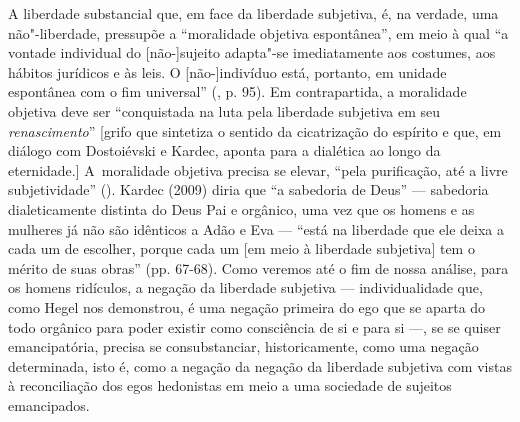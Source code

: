 A liberdade substancial que, em face da liberdade subjetiva, é, na
verdade, uma não"-liberdade, pressupõe a ``moralidade objetiva
espontânea'', em meio à qual ``a vontade individual do {[}não-{]}sujeito
adapta"-se imediatamente aos costumes, aos hábitos jurídicos e às leis. O
{[}não-{]}indivíduo está, portanto, em unidade espontânea com o fim
universal'' (, p. 95). Em contrapartida, a moralidade objetiva deve
ser ``conquistada na luta pela liberdade subjetiva em seu
\emph{renascimento}'' {[}grifo que sintetiza o sentido da cicatrização
do espírito e que, em diálogo com Dostoiévski e Kardec, aponta para a
dialética ao longo da eternidade.{]} A~moralidade objetiva precisa se
elevar, ``pela purificação, até a livre subjetividade'' (). Kardec
(2009) diria que ``a sabedoria de Deus'' --- sabedoria dialeticamente
distinta do Deus Pai e orgânico, uma vez que os homens e as mulheres já
não são idênticos a Adão e Eva --- ``está na liberdade que ele deixa a
cada um de escolher, porque cada um {[}em meio à liberdade subjetiva{]}
tem o mérito de suas obras'' (pp. 67-68). Como veremos até o fim de
nossa análise, para os homens ridículos, a negação da liberdade
subjetiva --- individualidade que, como Hegel nos demonstrou, é uma
negação primeira do ego que se aparta do todo orgânico para poder
existir como consciência de si e para si ---, se se quiser emancipatória,
precisa se consubstanciar, historicamente, como uma negação determinada,
isto é, como a negação da negação da liberdade subjetiva com vistas à
reconciliação dos egos hedonistas em meio a uma sociedade de sujeitos
emancipados.

